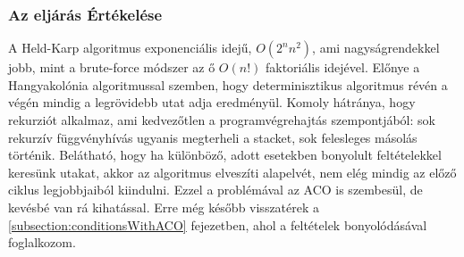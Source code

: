 \subsubsection{Az eljárás Értékelése}
\label{sssec:HeldKarpEvaluate}
A Held-Karp algoritmus exponenciális idejű, \(O(2^nn^2)\), ami nagyságrendekkel jobb, mint a brute-force módszer az ő \(O(n!)\) faktoriális idejével. Előnye a Hangyakolónia algoritmussal szemben, hogy determinisztikus algoritmus révén a végén mindig a legrövidebb utat adja eredményül. Komoly hátránya, hogy rekurziót alkalmaz, ami kedvezőtlen a programvégrehajtás szempontjából: sok rekurzív függvényhívás ugyanis megterheli a stacket, sok felesleges másolás történik. Belátható, hogy ha különböző, adott esetekben bonyolult feltételekkel keresünk utakat, akkor az algoritmus elveszíti alapelvét, nem elég mindig az előző ciklus legjobbjaiból kiindulni. Ezzel a problémával az ACO is szembesül, de kevésbé van rá kihatással. Erre még később visszatérek a \ref{subsection:conditionsWithACO} fejezetben, ahol a feltételek bonyolódásával foglalkozom.
